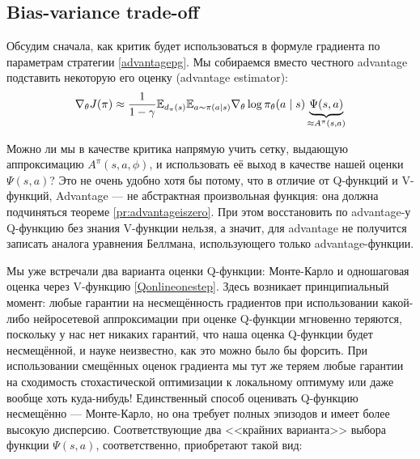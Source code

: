 
\subsection{Bias-variance trade-off}

Обсудим сначала, как критик будет использоваться в формуле градиента по параметрам стратегии \eqref{advantagepg}. Мы собираемся вместо честного advantage подставить некоторую его оценку (advantage estimator):
\begin{equation}\label{advantageestimation}
\nabla_{\theta} J(\pi) \approx \frac{1}{1 - \gamma}\mathbb{E}_{d_\pi(s)} \mathbb{E}_{a \sim \pi(a \mid s)} \nabla_{\theta} \log \pi_\theta (a \mid s) \underbrace{\Psi (s, a)}_{\approx A^{\pi}(s, a)}
\end{equation}

\begin{remark}
Можно ли мы в качестве критика напрямую учить сетку, выдающую аппроксимацию $A^{\pi}(s, a, \phi)$, и использовать её выход в качестве нашей оценки $\Psi (s, a)$? Это не очень удобно хотя бы потому, что в отличие от Q-функций и V-функций, Advantage --- не абстрактная произвольная функция: она должна подчиняться теореме \ref{pr:advantageiszero}. При этом восстановить по advantage-у Q-функцию без знания V-функции нельзя, а значит, для advantage не получится записать аналога уравнения Беллмана, использующего только advantage-функции.
\end{remark}

Мы уже встречали два варианта оценки Q-функции: Монте-Карло и одношаговая оценка через V-функцию \eqref{Qonlineonestep}. Здесь возникает принципиальный момент: любые гарантии на несмещённость градиентов при использовании какой-либо нейросетевой аппроксимации при оценке Q-функции мгновенно теряются, поскольку у нас нет никаких гарантий, что наша оценка Q-функции будет несмещённой, и науке неизвестно, как это можно было бы форсить. При использовании смещённых оценок градиента мы тут же теряем любые гарантии на сходимость стохастической оптимизации к локальному оптимуму или даже вообще хоть куда-нибудь! Единственный способ оценивать Q-функцию несмещённо --- Монте-Карло, но она требует полных эпизодов и имеет более высокую дисперсию. Соответствующие два <<крайних варианта>> выбора функции $\Psi (s, a)$, соответственно, приобретают такой вид:

